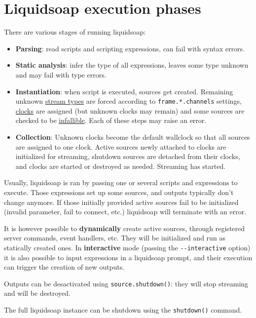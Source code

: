 \section{Liquidsoap execution phases}
There are various stages of running liquidsoap:

\begin{itemize}
\item \textbf{Parsing}: read scripts and scripting expressions, can fail with syntax errors.
\item \textbf{Static analysis}: infer the type of all expressions, leaves some type unknown and may fail with type errors.
\item \textbf{Instantiation}: when script is executed, sources get created. Remaining unknown \href{stream_contents.html}{stream types} are forced according to \verb+frame.*.channels+ settings, \href{clock.html}{clocks} are assigned (but unknown clocks may remain) and some sources are checked to be \href{source.htmls}{infallible}. Each of these steps may raise an error.
\item \textbf{Collection}: Unknown clocks become the default wallclock so that all sources are assigned to one clock. Active sources newly attached to clocks are initialized for streaming, shutdown sources are detached from their clocks, and clocks are started or destroyed as needed. Streaming has started.

\end{itemize}
Usually, liquidsoap is ran by passing one or several scripts and expressions to execute. Those expressions set up some sources, and outputs typically don't change anymore. If those initially provided active sources fail to be initialized (invalid parameter, fail to connect, etc.) liquidsoap will terminate with an error.

It is however possible to \textbf{dynamically} create active sources,
through registered server commands, event handlers, etc.
They will be initialized and run as statically created ones.
In \textbf{interactive} mode (passing the \verb+--interactive+ option)
it is also possible to input expressions in a liquidsoap prompt,
and their execution can trigger the creation of new outputs.

Outputs can be desactivated using \verb+source.shutdown()+:
they will stop streaming and will be destroyed.

The full liquidsoap instance
can be shutdown using the \verb+shutdown()+ command.

